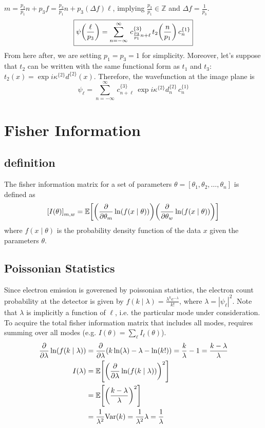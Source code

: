 \documentclass[12pt]{article}
\begin{document}
$m = \frac{p_3}{p_1}n+p_3 f = \frac{p_3}{p_1}n+p_3 (\Delta f) \ell$, implying $\frac{p_3}{p_1} \in \mathbb{Z}$ and $\Delta f = \frac{1}{p_3}$.
\begin{equation}
    \boxed{
    \psi\qty(\frac{\ell}{p_3}) = 
    \sum_{n=-\infty}^{\infty} \,
     c^{\{3\}}_{\frac{p_3}{p_1}n + \ell} \,
        t_2\qty(\frac{n}{p_1}) \,
        c^{\{1\}}_n 
    }
\end{equation}
From here after, we are setting $p_1 = p_3 = 1$ for simplicity. Moreover, let's suppose that 
$t_2$ can be written with the same functional form as $t_1$ and $t_3$: 
$t_2(x) = \exp{i \kappa^{\{2\}} d^{\{2\}}(x)}$. Therefore, the wavefunction at the image plane is
\begin{equation*}
    \psi_\ell = 
    \sum_{n=-\infty}^{\infty} \,
     c^{\{3\}}_{n + \ell} \,
        \exp{i \kappa^{\{2\}} d^{\{2\}}_n} \,
        c^{\{1\}}_n 
\end{equation*}


\section{Fisher Information}
\subsection{definition}
The fisher information matrix for a set of parameters $\theta = \left[\theta_1, \theta_2, \dots, \theta_n\right]$ is defined as
\begin{equation*}
    \qty[I(\theta)]_{m,w} = 
    \mathbb{E}\qty[
        \qty(\pdv{\theta_m} \ln(f(x\mid \theta)))
        \qty(\pdv{\theta_w} \ln(f(x\mid \theta)))
        ]
\end{equation*}
where $f(x\mid \theta)$ is the probability density function of the data $x$ given the parameters $\theta$.

\subsection{Poissonian Statistics}
Since electron emission is goverened by poissonian statistics, the electron count
probability at the detector is given by $f(k\mid \lambda) = \frac{\lambda^k e^{-\lambda}}{k!}$, 
where $\lambda = |\psi_\ell|^2$. Note that $\lambda$ is implicitly a function of $\ell$, i.e. the 
particular mode under consideration. To acquire the total fisher information matrix that includes 
all modes, requires summing over all modes (e.g. $I(\theta) = \sum_{\ell} I_\ell (\theta)$).
\begin{align*}
    \pdv{\lambda} \ln(f(k\mid \lambda)) &= \pdv{\lambda} \qty( k \ln(\lambda) - \lambda - \ln(k!)) = \frac{k}{\lambda} - 1 = \frac{k-\lambda}{\lambda}\\
    I(\lambda) &= \mathbb{E}\qty[\qty(\pdv{\lambda} \ln(f(k\mid \lambda)))^2] \\
    &= \mathbb{E}\qty[\qty(\frac{k-\lambda}{\lambda})^2] \\
    &= \frac{1}{\lambda^2} \mathrm{Var}(k) = \frac{1}{\lambda^2} \lambda = \frac{1}{\lambda}
\end{align*}
\end{document}
